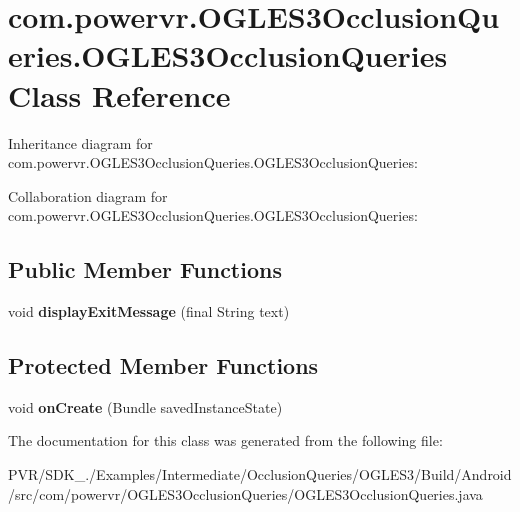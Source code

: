 \hypertarget{classcom_1_1powervr_1_1_o_g_l_e_s3_occlusion_queries_1_1_o_g_l_e_s3_occlusion_queries}{\section{com.\+powervr.\+O\+G\+L\+E\+S3\+Occlusion\+Queries.\+O\+G\+L\+E\+S3\+Occlusion\+Queries Class Reference}
\label{classcom_1_1powervr_1_1_o_g_l_e_s3_occlusion_queries_1_1_o_g_l_e_s3_occlusion_queries}
}


Inheritance diagram for com.\+powervr.\+O\+G\+L\+E\+S3\+Occlusion\+Queries.\+O\+G\+L\+E\+S3\+Occlusion\+Queries\+:


Collaboration diagram for com.\+powervr.\+O\+G\+L\+E\+S3\+Occlusion\+Queries.\+O\+G\+L\+E\+S3\+Occlusion\+Queries\+:
\subsection*{Public Member Functions}
\begin{DoxyCompactItemize}
\item 
\hypertarget{classcom_1_1powervr_1_1_o_g_l_e_s3_occlusion_queries_1_1_o_g_l_e_s3_occlusion_queries_a4739f1fde8aa5a04deb461c8a352ffd6}{void {\bfseries display\+Exit\+Message} (final String text)}\label{classcom_1_1powervr_1_1_o_g_l_e_s3_occlusion_queries_1_1_o_g_l_e_s3_occlusion_queries_a4739f1fde8aa5a04deb461c8a352ffd6}

\end{DoxyCompactItemize}
\subsection*{Protected Member Functions}
\begin{DoxyCompactItemize}
\item 
\hypertarget{classcom_1_1powervr_1_1_o_g_l_e_s3_occlusion_queries_1_1_o_g_l_e_s3_occlusion_queries_ae0745135eae8240725ea4724b3388f22}{void {\bfseries on\+Create} (Bundle saved\+Instance\+State)}\label{classcom_1_1powervr_1_1_o_g_l_e_s3_occlusion_queries_1_1_o_g_l_e_s3_occlusion_queries_ae0745135eae8240725ea4724b3388f22}

\end{DoxyCompactItemize}


The documentation for this class was generated from the following file\+:\begin{DoxyCompactItemize}
\item 
P\+V\+R/\+S\+D\+K\+\_./\+Examples/\+Intermediate/\+Occlusion\+Queries/\+O\+G\+L\+E\+S3/\+Build/\+Android/src/com/powervr/\+O\+G\+L\+E\+S3\+Occlusion\+Queries/O\+G\+L\+E\+S3\+Occlusion\+Queries.\+java\end{DoxyCompactItemize}
